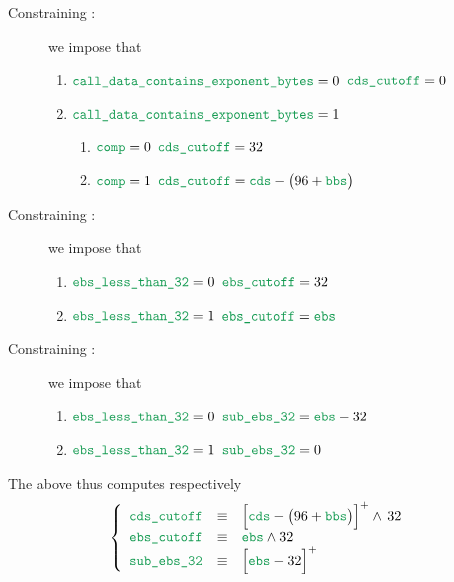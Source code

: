 \begin{description}
\begin{description}
			\item[Constraining \locCdsCutoff{}:] we impose that
				\begin{enumerate}
					\item \If $\locCallDataContainsExponentBytes = 0$ \Then $\locCdsCutoff = 0$
					\item \If $\locCallDataContainsExponentBytes = 1$ \Then
						\begin{enumerate}
							\item \If $\locCmp = 0$ \Then $\locCdsCutoff = 32$
							\item \If $\locCmp = 1$ \Then $\locCdsCutoff = \locCds - \big( 96 + \locBbs \big)$
						\end{enumerate}
				\end{enumerate}
			\item[Constraining \locEbsCutoff       {}:] we impose that
				\begin{enumerate}
					\item \If $\locEbsLtThirtyTwo = 0$ \Then $\locEbsCutoff = 32$ 
					\item \If $\locEbsLtThirtyTwo = 1$ \Then $\locEbsCutoff = \locEbs$ 
				\end{enumerate}
			\item[Constraining \locEbsSubThirtyTwo {}:] we impose that
				\begin{enumerate}
					\item \If $\locEbsLtThirtyTwo = 0$ \Then $\locEbsSubThirtyTwo = \locEbs - 32$ 
					\item \If $\locEbsLtThirtyTwo = 1$ \Then $\locEbsSubThirtyTwo = 0$ 
				\end{enumerate}
		\end{description}
\end{description}
\saNote{} The above thus computes respectively
\[
	\left\{ \begin{array}{lcl}
		\locCdsCutoff           & \equiv & \Big[ \locCds - \big( 96 + \locBbs \big) \Big] ^ + \wedge \, 32 \\
		\locEbsCutoff           & \equiv & \locEbs \wedge 32                                               \\
		\locEbsSubThirtyTwo     & \equiv & \Big[ \locEbs - 32 \Big] ^ +                                    \\
	\end{array} \right.
\]
